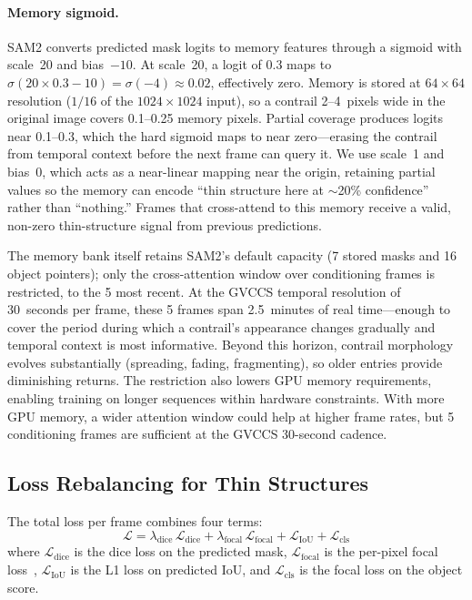 \documentclass[1p,11pt]{elsarticle}
\begin{document}
\paragraph{Memory sigmoid.} SAM2 converts predicted mask logits to memory features through a sigmoid with scale~20 and bias~$-10$. At scale~20, a logit of $0.3$ maps to $\sigma(20 \times 0.3 - 10) = \sigma(-4) \approx 0.02$, effectively zero. Memory is stored at $64 \times 64$ resolution ($1/16$ of the $1024 \times 1024$ input), so a contrail 2--4~pixels wide in the original image covers 0.1--0.25 memory pixels. Partial coverage produces logits near 0.1--0.3, which the hard sigmoid maps to near zero---erasing the contrail from temporal context before the next frame can query it. We use scale~1 and bias~0, which acts as a near-linear mapping near the origin, retaining partial values so the memory can encode ``thin structure here at $\sim$20\% confidence'' rather than ``nothing.'' Frames that cross-attend to this memory receive a valid, non-zero thin-structure signal from previous predictions.

The memory bank itself retains SAM2's default capacity (7 stored masks and 16 object pointers); only the cross-attention window over conditioning frames is restricted, to the 5 most recent. At the GVCCS temporal resolution of 30~seconds per frame, these 5 frames span 2.5~minutes of real time---enough to cover the period during which a contrail's appearance changes gradually and temporal context is most informative. Beyond this horizon, contrail morphology evolves substantially (spreading, fading, fragmenting), so older entries provide diminishing returns. The restriction also lowers GPU memory requirements, enabling training on longer sequences within hardware constraints. With more GPU memory, a wider attention window could help at higher frame rates, but 5 conditioning frames are sufficient at the GVCCS 30-second cadence.

\subsection{Loss Rebalancing for Thin Structures}

The total loss per frame combines four terms:
\begin{equation}
    \mathcal{L} = \lambda_\text{dice}\,\mathcal{L}_\text{dice} + \lambda_\text{focal}\,\mathcal{L}_\text{focal} + \mathcal{L}_\text{IoU} + \mathcal{L}_\text{cls}
\label{eq:loss}
\end{equation}
where $\mathcal{L}_\text{dice}$ is the dice loss on the predicted mask, $\mathcal{L}_\text{focal}$ is the per-pixel focal loss~\cite{lin2017focal}, $\mathcal{L}_\text{IoU}$ is the L1 loss on predicted IoU, and $\mathcal{L}_\text{cls}$ is the focal loss on the object score.
\end{document}
